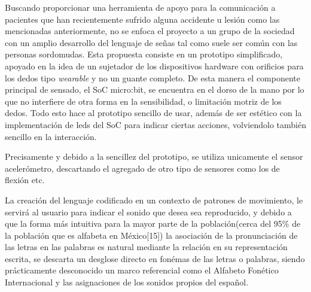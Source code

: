 \hfill \break
\justifying
Buscando proporcionar una herramienta de apoyo para la comunicación a pacientes que han recientemente sufrido alguna accidente u lesión como las mencionadas anteriormente, no se enfoca el proyecto a un grupo de la sociedad con un amplio desarrollo del lenguaje de señas tal como suele ser común con las personas sordomudas. Esta propuesta consiste en un prototipo simplificado, apoyado en la idea de un sujetador de los dispositivos hardware con orificios para los dedos tipo \textit{wearable} y no un guante completo. De esta manera el componente principal de sensado, el SoC micro:bit, se encuentra en el dorso de la mano por lo que no interfiere de otra forma en la sensibilidad, o limitación motriz de los dedos. Todo esto hace al prototipo sencillo de usar, además de ser estético con la implementación de leds del SoC para indicar ciertas acciones, volviendolo también sencillo en la interacción.

\hfill \break
\justifying
Precisamente y debido a la sencillez del prototipo, se utiliza unicamente el sensor acelerómetro, descartando el agregado de otro tipo de sensores como los de flexión etc.

\hfill\break
\justifying
La creación del lenguaje codificado en un contexto de patrones de movimiento, le servirá al usuario para indicar el sonido que desea sea reproducido, y debido a que la forma más intuitiva para la mayor parte de la población(cerca del 95\% de la población que es alfabeta en México[15]) la asociación de la pronunciación de las letras en las palabras es natural mediante la relación en su representación escrita, se descarta un desglose directo en fonémas de las letras o palabras, siendo prácticamente desconocido un marco referencial como el Alfabeto Fonético Internacional y las asignaciones de los sonidos propios del español.